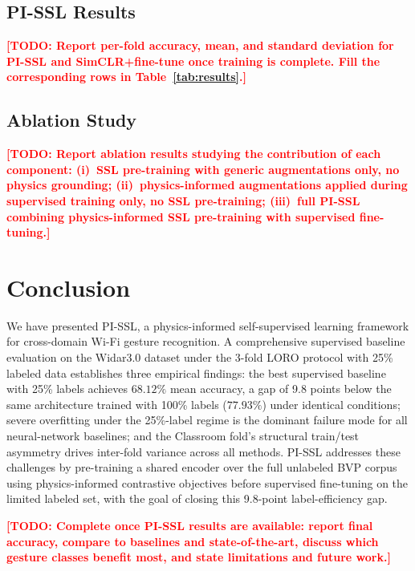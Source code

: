 \documentclass[journal]{IEEEtran}
\newcommand{\todo}[1]{\textcolor{red}{\textbf{[TODO: #1]}}}
\begin{document}
\subsection{PI-SSL Results}
\label{sec:experiments:pissl}

\todo{Report per-fold accuracy, mean, and standard deviation for
PI-SSL and SimCLR+fine-tune once training is complete. Fill the
corresponding rows in Table~\ref{tab:results}.}

\subsection{Ablation Study}
\label{sec:experiments:ablation}

\todo{Report ablation results studying the contribution of each
component: (i)~SSL pre-training with generic augmentations only,
no physics grounding; (ii)~physics-informed augmentations applied
during supervised training only, no SSL pre-training; (iii)~full
PI-SSL combining physics-informed SSL pre-training with supervised
fine-tuning.}

\section{Conclusion}
\label{sec:conclusion}

We have presented PI-SSL, a physics-informed self-supervised learning
framework for cross-domain Wi-Fi gesture recognition.
A comprehensive supervised baseline evaluation on the Widar3.0 dataset
under the 3-fold LORO protocol with 25\% labeled data establishes
three empirical findings: the best supervised baseline with 25\%
labels achieves $68.12\%$ mean accuracy, a gap of 9.8 points below
the same architecture trained with 100\% labels ($77.93\%$) under
identical conditions; severe overfitting under the 25\%-label regime
is the dominant failure mode for all neural-network baselines; and
the Classroom fold's structural train/test asymmetry drives
inter-fold variance across all methods.
PI-SSL addresses these challenges by pre-training a shared encoder
over the full unlabeled BVP corpus using physics-informed contrastive
objectives before supervised fine-tuning on the limited labeled set,
with the goal of closing this 9.8-point label-efficiency gap.

\todo{Complete once PI-SSL results are available: report final
accuracy, compare to baselines and state-of-the-art, discuss which
gesture classes benefit most, and state limitations and future work.}
\end{document}

